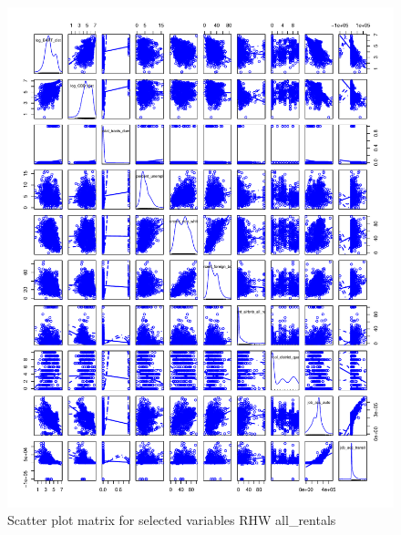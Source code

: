\documentclass[10pt, letterpaper]{amsart}
\begin{document}
\begin{figure}[H]
  \caption{Scatter plot matrix for selected variables RHW all\_rentals}
  \includegraphics[scale=0.6]{spm_selected_RHW_allrentals}
\end{figure}
\end{document}
